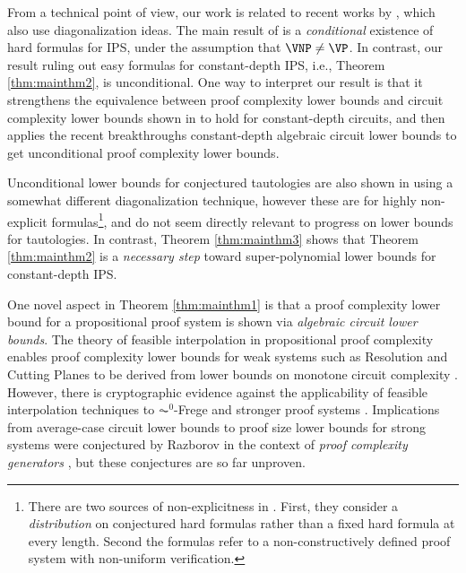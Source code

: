 \documentclass[11pt,letter]{article}
\theoremstyle{remark} %
\begin{document}
{    From a technical point of view, our work is related to recent works by \cite{ST25,PS19}, which also use diagonalization ideas. The main result of \cite{ST25} is a {\it conditional} existence of hard formulas for  IPS, under the assumption that $\VNP \neq \VP$. In contrast, our result ruling out easy formulas for constant-depth IPS, i.e., Theorem \ref{thm:mainthm2}, is unconditional. One way to interpret our result is that it strengthens the equivalence between proof complexity lower bounds and circuit complexity lower bounds shown in \cite{ST25} to hold for constant-depth circuits, and then applies the recent breakthroughs constant-depth algebraic circuit lower bounds \cite{LST25, forbes2024low} to get unconditional proof complexity lower bounds.

    Unconditional lower bounds for conjectured tautologies are also shown in \cite{PS21} using a somewhat different diagonalization technique, however these are for highly non-explicit formulas\footnote{There are two sources of non-explicitness in \cite{PS21}. First, they consider a {\it distribution} on conjectured hard formulas rather than a fixed hard formula at every length. Second the formulas refer to a non-constructively defined proof system with non-uniform verification.}, and do not seem directly relevant to progress on lower bounds for tautologies. In contrast, Theorem \ref{thm:mainthm3} shows that Theorem \ref{thm:mainthm2} is a {\it necessary step} toward super-polynomial lower bounds for constant-depth IPS.

    One novel aspect in Theorem \ref{thm:mainthm1} is that a proof complexity lower bound for a propositional proof system is shown via {\it algebraic circuit lower bounds}. The theory of feasible interpolation in propositional proof complexity enables proof complexity lower bounds for weak systems such as Resolution and Cutting Planes to be derived from lower bounds on monotone circuit complexity \cite{BPR97,Kra97-Interpolation,Pud97}. However, there is cryptographic evidence against the applicability of feasible interpolation techniques to $\AC^0$-Frege and stronger proof systems \cite{BPR00}. Implications from average-case circuit lower bounds to proof size lower bounds for strong systems were conjectured by Razborov \cite{Razb15-annals} in the context of {\it proof complexity generators} \cite{ABSRW00}, but these conjectures are so far unproven.
    
}
\end{document}
